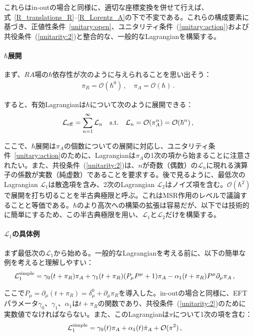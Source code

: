 これらはin-outの場合と同様に、適切な座標変換を併せて行えば、式~\eqref{R_translations_R}--\eqref{R_Lorentz_A}の下で不変である。これらの構成要素に基づき、正値性条件~\eqref{unitary:open}、ユニタリティ条件~(\ref{unitary:action})および共役条件~(\ref{unitarity:2})と整合的な、一般的なLagrangianを構築する。

\paragraph{$\hbar$展開}
まず、$RA$場の$\hbar$依存性が次のように与えられることを思い出そう：
\begin{align}
\pi_R=\mathcal{O}(\hbar^0)\,,
\quad
\pi_A=\mathcal{O}(\hbar)\,.
\end{align}

すると、有効Lagrangianは$\hbar$について次のように展開できる：
\begin{align}
\mathcal{L}_{\rm eff}=\sum_{n=1}^\infty \mathcal{L}_n
\quad
{\rm s.t.}
\quad
\mathcal{L}_n=\mathcal{O}(\pi_A^n)=\mathcal{O}(\hbar^n)\,,
\end{align}

ここで、$\hbar$展開は$\pi_A$の個数についての展開に対応し、ユニタリティ条件~\eqref{unitary:action}のために、Lagrangianは$\pi_A$の1次の項から始まることに注意されたい。また、共役条件~(\ref{unitarity:2})は、$n$が奇数（偶数）の$\mathcal{L}_n$に現れる演算子の係数が実数（純虚数）であることを要求する。後で見るように、最低次のLagrangian $\mathcal{L}_1$は散逸項を含み、2次のLagrangian $\mathcal{L}_2$はノイズ項を含む。$\mathcal{O}(\hbar^2)$で展開を打ち切ることを半古典極限と呼ぶ。これはMSR作用のレベルで議論することと等価である。$\hbar$のより高次への構築の拡張は容易だが、以下では技術的に簡単にするため、この半古典極限を用い、$\mathcal{L}_1$と$\mathcal{L}_2$だけを構築する。

\paragraph{$\mathcal{L}_1$の具体例}

まず最低次の$\mathcal{L}_1$から始める。一般的なLagrangianを考える前に、以下の簡単な例を考えると理解しやすい：
\begin{align}
\mathcal{L}_1^{\rm simple}&=
\gamma_0(t+\pi_R)\pi_A
+\gamma_1(t+\pi_R)(P_\mu P^\mu+1)\pi_A
 -\alpha_1(t+\pi_R)P^\mu\partial_\mu\pi_A\,,
 \label{Eq:SimpleL}
\end{align}

ここで$P_\mu=\partial_\mu(t+\pi_R)=\delta_\mu^0+\partial_\mu\pi_R$を導入した。in-outの場合と同様に、EFTパラメータ$\gamma_0$、$\gamma_1$、$\alpha_1$は$t+\pi_R$の関数であり、共役条件~(\ref{unitarity:2})のために実数値でなければならない。また、このLagrangianは$\pi$について1次の項を含む：
\begin{align}
\mathcal{L}_1^{\rm simple}&=\gamma_0(t)\pi_A+\alpha_1(t)\dot{\pi}_A+\mathcal{O}(\pi^2)\,,
\end{align}

